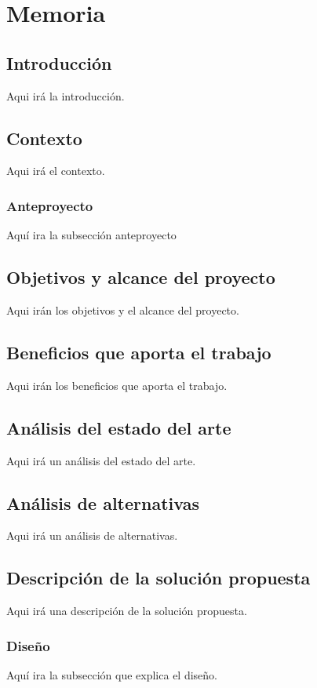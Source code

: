 
\chapter{Memoria} %

\label{Memoria} %

\section{Introducción}

Aqui irá la introducción.

\section{Contexto}

Aqui irá el contexto.

\subsection{Anteproyecto}

Aquí ira la subsección anteproyecto

\section{Objetivos y alcance del proyecto}

Aqui irán los objetivos y el alcance del proyecto.

\section{Beneficios que aporta el trabajo}

Aqui irán los beneficios que aporta el trabajo.

\section{Análisis del estado del arte}

Aqui irá un análisis del estado del arte.

\section{Análisis de alternativas}

Aqui irá un análisis de alternativas.

\section{Descripción de la solución propuesta}

Aqui irá una descripción de la solución propuesta.

\subsection{Diseño}

Aquí ira la subsección que explica el diseño.
